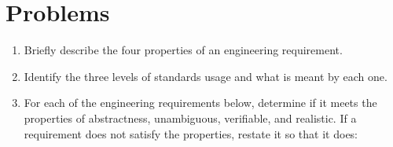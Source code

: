 \section{Problems}
\label{section:problems}

\begin{enumerate}
\def\labelenumi{\arabic{enumi}.}
\item
  Briefly describe the four properties of an engineering requirement.
\item
  Identify the three levels of standards usage and what is meant by each
  one.
\item
  For each of the engineering requirements below, determine if it meets
  the properties of abstractness, unambiguous, verifiable, and
  realistic. If a requirement does not satisfy the properties, restate
  it so that it does:
\end{enumerate}

